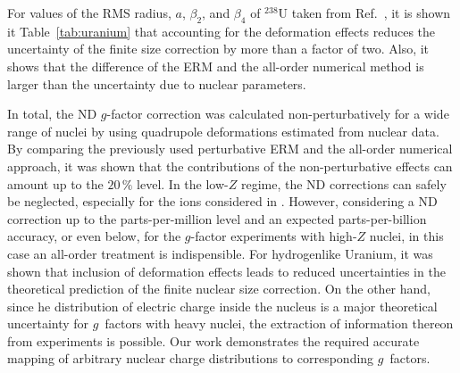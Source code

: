 For values of the RMS radius, $a$, $\beta_2$, and $\beta_4$ of $^{238}$U  taken from Ref.~\cite{kozhedub2008}, it is shown it Table~\ref{tab:uranium} that accounting for the deformation effects reduces the uncertainty of the finite size correction by more than a factor of two. Also, it shows that the difference of the ERM and the all-order numerical method is larger than the uncertainty due to nuclear parameters.

In total, the ND $g$-factor correction was calculated non-perturbatively for a wide range of nuclei by using quadrupole deformations estimated from nuclear data.
By comparing the previously used perturbative ERM and the all-order numerical approach, it was shown that the contributions of the non-perturbative effects can amount up to the $20\,\%$ level.
In the low-$Z$ regime, the ND corrections can safely be neglected, especially for the ions considered in \cite{Sturm2014}. However, considering a ND correction up to the parts-per-million level and an expected parts-per-billion accuracy, or even below, for the $g$-factor experiments with high-$Z$ nuclei, in this case an all-order treatment is indispensible. 
For hydrogenlike Uranium, it was shown that inclusion of deformation effects leads to reduced uncertainties in the theoretical prediction of the finite nuclear size correction.
On the other hand, since he distribution of electric charge inside the nucleus is a major theoretical uncertainty for $g$~factors with heavy nuclei, the extraction of information thereon from experiments is possible. Our work demonstrates the required accurate mapping of arbitrary nuclear charge distributions to corresponding $g$~factors.
\newpage
